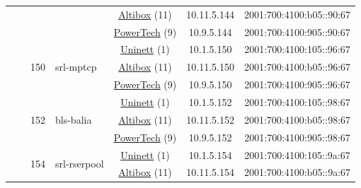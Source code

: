 \begin{small}
\begin{center}
\begin{longtable}{|c|c|c|c|c|c|c|c|}
  &  &  &  & \multicolumn{2}{|c|}{\tiny{\href{https://www.altibox.no}{Altibox} (11)}} & \tiny{10.11.5.144} & \tiny{2001:700:4100:b05::90:67} \\* \cline{5-5}\cline{6-6}\cline{7-7}\cline{8-8}
  &  &  &  & \multicolumn{2}{|c|}{\tiny{\href{http://www.powertech.no}{PowerTech} (9)}} & \tiny{10.9.5.144} & \tiny{2001:700:4100:905::90:67} \\* \cline{3-3}\cline{4-4}\cline{5-5}\cline{6-6}\cline{7-7}\cline{8-8}
  &  & \multirow{3}{*}{\tiny{150}} & \multicolumn{1}{|l|}{\multirow{3}{*}{\tiny{srl-mptcp}}} & \multicolumn{2}{|c|}{\tiny{\href{https://www.uninett.no}{Uninett} (1)}} & \tiny{10.1.5.150} & \tiny{2001:700:4100:105::96:67} \\* \cline{5-5}\cline{6-6}\cline{7-7}\cline{8-8}
  &  &  &  & \multicolumn{2}{|c|}{\tiny{\href{https://www.altibox.no}{Altibox} (11)}} & \tiny{10.11.5.150} & \tiny{2001:700:4100:b05::96:67} \\* \cline{5-5}\cline{6-6}\cline{7-7}\cline{8-8}
  &  &  &  & \multicolumn{2}{|c|}{\tiny{\href{http://www.powertech.no}{PowerTech} (9)}} & \tiny{10.9.5.150} & \tiny{2001:700:4100:905::96:67} \\* \cline{3-3}\cline{4-4}\cline{5-5}\cline{6-6}\cline{7-7}\cline{8-8}
  &  & \multirow{3}{*}{\tiny{152}} & \multicolumn{1}{|l|}{\multirow{3}{*}{\tiny{bls-balia}}} & \multicolumn{2}{|c|}{\tiny{\href{https://www.uninett.no}{Uninett} (1)}} & \tiny{10.1.5.152} & \tiny{2001:700:4100:105::98:67} \\* \cline{5-5}\cline{6-6}\cline{7-7}\cline{8-8}
  &  &  &  & \multicolumn{2}{|c|}{\tiny{\href{https://www.altibox.no}{Altibox} (11)}} & \tiny{10.11.5.152} & \tiny{2001:700:4100:b05::98:67} \\* \cline{5-5}\cline{6-6}\cline{7-7}\cline{8-8}
  &  &  &  & \multicolumn{2}{|c|}{\tiny{\href{http://www.powertech.no}{PowerTech} (9)}} & \tiny{10.9.5.152} & \tiny{2001:700:4100:905::98:67} \\* \cline{3-3}\cline{4-4}\cline{5-5}\cline{6-6}\cline{7-7}\cline{8-8}
  &  & \multirow{3}{*}{\tiny{154}} & \multicolumn{1}{|l|}{\multirow{3}{*}{\tiny{srl-rserpool}}} & \multicolumn{2}{|c|}{\tiny{\href{https://www.uninett.no}{Uninett} (1)}} & \tiny{10.1.5.154} & \tiny{2001:700:4100:105::9a:67} \\* \cline{5-5}\cline{6-6}\cline{7-7}\cline{8-8}
  &  &  &  & \multicolumn{2}{|c|}{\tiny{\href{https://www.altibox.no}{Altibox} (11)}} & \tiny{10.11.5.154} & \tiny{2001:700:4100:b05::9a:67} \\* \cline{5-5}\cline{6-6}\cline{7-7}\cline{8-8}

\end{longtable}
\end{center}
\end{small}
